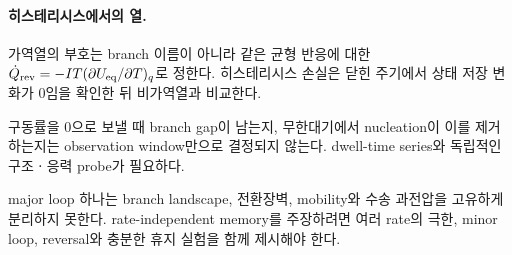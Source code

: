 \paragraph{ 히스테리시스에서의 열.}
가역열의 부호는 branch 이름이 아니라 같은 균형 반응에 대한
$\dot Q_{\mathrm{rev}}=-IT(\partial U_{\mathrm{eq}}/\partial T)_q$로 정한다.
히스테리시스 손실은 닫힌 주기에서 상태 저장 변화가 0임을 확인한
뒤 비가역열과 비교한다.

\begin{openitem}
구동률을 0으로 보낼 때 branch gap이 남는지, 무한대기에서
nucleation이 이를 제거하는지는 observation window만으로 결정되지
않는다. dwell-time series와 독립적인 구조ㆍ응력 probe가 필요하다.
\end{openitem}

\begin{identifiability}
major loop 하나는 branch landscape, 전환장벽, mobility와 수송
과전압을 고유하게 분리하지 못한다. rate-independent memory를
주장하려면 여러 rate의 극한, minor loop, reversal와 충분한
휴지 실험을 함께 제시해야 한다.
\end{identifiability}
